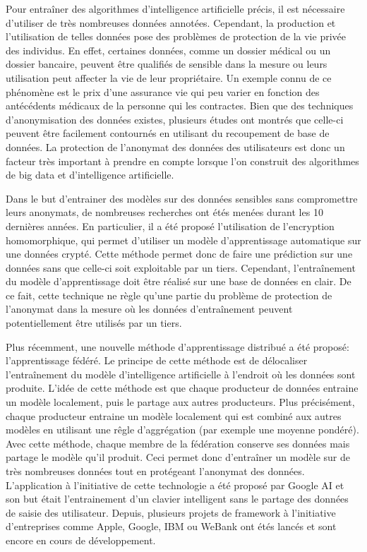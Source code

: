 \documentclass[stage3a]{tnreport} %
\begin{document}
Pour entraîner des algorithmes d'intelligence artificielle précis, il est nécessaire d'utiliser de très nombreuses données annotées. Cependant, la production et l'utilisation de telles données pose des problèmes de protection de la vie privée des individus. En effet, certaines données, comme un dossier médical ou un dossier bancaire, peuvent être qualifiés de sensible dans la mesure ou leurs utilisation peut affecter la vie de leur propriétaire. Un exemple connu de ce phénomène est le prix d'une assurance vie qui peu varier en fonction des antécédents médicaux de la personne qui les contractes. Bien que des techniques d'anonymisation des données existes, plusieurs études ont montrés que celle-ci peuvent être facilement contournés en utilisant du recoupement de base de données. La protection de l'anonymat des données des utilisateurs est donc un facteur très important à prendre en compte lorsque l'on construit des algorithmes de big data et d'intelligence artificielle.

Dans le but d'entrainer des modèles sur des données sensibles sans compromettre leurs anonymats, de nombreuses recherches ont étés menées durant les 10 dernières années. En particulier, il a été proposé  l'utilisation de l'encryption homomorphique, qui permet d'utiliser un modèle d'apprentissage automatique sur une données crypté. Cette méthode permet donc de faire une prédiction sur une données sans que celle-ci soit exploitable par un tiers. Cependant, l'entraînement du modèle d'apprentissage doit être réalisé sur une base de données en clair. De ce fait, cette technique ne règle qu'une partie du problème de protection de l'anonymat dans la mesure où les données d'entraînement peuvent potentiellement être utilisés par un tiers.

Plus récemment, une nouvelle méthode d'apprentissage distribué a été proposé: l'apprentissage fédéré. Le principe de cette méthode est de délocaliser l'entraînement du modèle d'intelligence artificielle à l'endroit où les données sont produite. L'idée de cette méthode est que chaque producteur de données entraine un modèle localement, puis le partage aux autres producteurs. Plus précisément, chaque producteur entraine un modèle localement qui est combiné aux autres modèles en utilisant une rêgle d'aggrégation (par exemple une moyenne pondéré). Avec cette méthode, chaque membre de la fédération conserve ses données mais partage le modèle qu'il produit. Ceci permet donc d'entraîner un modèle sur de très nombreuses données tout en protégeant l'anonymat des données. L'application à l'initiative de cette technologie a été proposé par Google AI et son but était l'entrainement d'un clavier intelligent sans le partage des données de saisie des utilisateur. Depuis, plusieurs projets de framework à l'initiative d'entreprises comme Apple, Google, IBM ou WeBank ont étés lancés et sont encore en cours de développement. 
\end{document}
